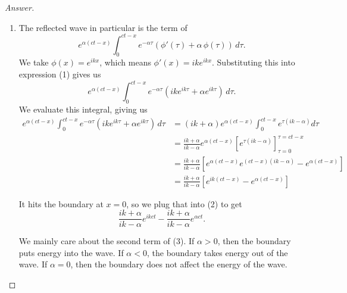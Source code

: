 \documentclass{article}
\theoremstyle{definition}
\renewcommand\qedsymbol{$\blacksquare$}
\newenvironment{ans}{\begin{proof}[Answer]\renewcommand{\qedsymbol}{}}{\end{proof}}
\begin{document}
\begin{ans}
\begin{enumerate}
    \item The reflected wave in particular is the term of 
    \begin{equation}
        e^{\alpha (ct-x)}\int_0^{ct-x} e^{-\alpha\tau}(\phi'(\tau) + \alpha\, \phi(\tau))\,d\tau.
    \end{equation}
    We take $\phi(x) = e^{ikx}$, which means $\phi'(x) = ike^{ikx}$. Substituting this into expression (1) gives us
    \begin{equation*}
        e^{\alpha (ct-x)}\int_0^{ct-x} e^{-\alpha\tau}(ike^{ik\tau} + \alpha e^{ik\tau})\,d\tau.
    \end{equation*}
    We evaluate this integral, giving us
    \begin{align*}
        e^{\alpha (ct-x)}\int_0^{ct-x} e^{-\alpha\tau}(ike^{ik\tau} + \alpha e^{ik\tau})\,d\tau &= (ik + \alpha) e^{\alpha (ct-x)}\int_0^{ct-x}e^{\tau(ik - \alpha)}d\tau\\
        &= \frac{ik + \alpha}{ik - \alpha} e^{\alpha (ct-x)} \left[e^{\tau(ik - \alpha)}\right]_{\tau = 0}^{\tau = ct - x}\\
        &= \frac{ik + \alpha}{ik - \alpha}\left[ e^{\alpha (ct-x)} e^{(ct-x)(ik-\alpha)} -  e^{\alpha (ct-x)}\right]\\
        &= \frac{ik + \alpha}{ik - \alpha}\left[ e^{ik(ct-x)} - e^{\alpha(ct-x)} \right] \tag{2}
    \end{align*}

    It hits the boundary at $x=0$, so we plug that into (2) to get
    \begin{equation*}
        \frac{ik + \alpha}{ik - \alpha}e^{ikct} - \frac{ik + \alpha}{ik - \alpha}e^{\alpha ct}. \tag{3}
    \end{equation*}

    We mainly care about the second term of (3). If $\alpha > 0$, then the boundary puts energy into the wave. If $\alpha < 0$, the boundary takes energy out of the wave. If $\alpha = 0$, then the boundary does not affect the energy of the wave.
    
\end{enumerate}
\end{ans}
\end{document}
